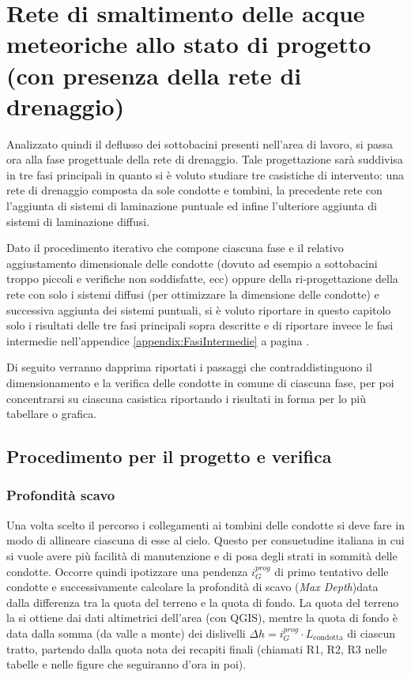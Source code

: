 \chapter{Rete di smaltimento delle acque meteoriche allo stato di progetto (con presenza
della rete di drenaggio)}
Analizzato quindi il deflusso dei sottobacini presenti nell'area di lavoro, si passa ora alla fase progettuale della rete di drenaggio. 
Tale progettazione sarà suddivisa in tre fasi principali in quanto si è voluto studiare tre casistiche di intervento: una rete di drenaggio composta da sole condotte e tombini, la precedente rete con l'aggiunta di sistemi di laminazione puntuale ed infine l'ulteriore aggiunta di sistemi di laminazione diffusi.

Dato il procedimento iterativo che compone ciascuna fase e il relativo aggiustamento dimensionale delle condotte (dovuto ad esempio  a sottobacini troppo piccoli e verifiche non soddisfatte, ecc) oppure della ri-progettazione della rete con solo i sistemi diffusi (per ottimizzare la dimensione delle condotte) e successiva aggiunta dei sistemi puntuali, si è voluto riportare in questo capitolo solo i risultati delle tre fasi principali sopra descritte e di  riportare invece le fasi intermedie nell'appendice \ref{appendix:FasiIntermedie} a pagina \pageref{appendix:FasiIntermedie}. 

Di seguito verranno dapprima riportati i passaggi che contraddistinguono il dimensionamento e la verifica delle condotte in comune di ciascuna fase, per poi concentrarsi su ciascuna casistica riportando i risultati in forma per lo più tabellare o grafica.

\section{Procedimento per il progetto e verifica}
\subsection{Profondità scavo}
Una volta scelto il percorso i collegamenti ai tombini delle condotte si deve fare in modo di allineare ciascuna di esse al cielo. 
Questo per consuetudine italiana in cui si vuole avere più facilità di manutenzione e di posa degli strati in sommità delle condotte. 
Occorre quindi ipotizzare una pendenza  $i_G^{prog}$  di primo tentativo delle condotte e successivamente calcolare la profondità di scavo (\emph{Max Depth})data dalla differenza tra la quota del terreno e la quota di fondo.
La quota del terreno la si ottiene dai dati altimetrici dell'area (con QGIS), mentre la quota di fondo è data dalla somma (da valle a monte) dei dislivelli $\Delta h = i_G^{prog} \cdot L_{\text{condotta}}$ di ciascun tratto, partendo dalla quota nota dei recapiti finali (chiamati R1, R2, R3 nelle tabelle e nelle figure che seguiranno d'ora in poi).

